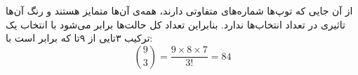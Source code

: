 از آن جایی که توپ‌ها شماره‌های متفاوتی دارند، همه‌ی آن‌ها متمایز هستند و رنگ آن‌ها تاثیری در تعداد انتخاب‌ها ندارد. بنابراین تعداد کل حالت‌ها برابر می‌‌شود با انتخاب یک ترکیب ۳‌تایی از ۹‌تا که برابر است با:
  $${9\choose 3} = \frac{9\times 8\times 7}{3!} = 84$$